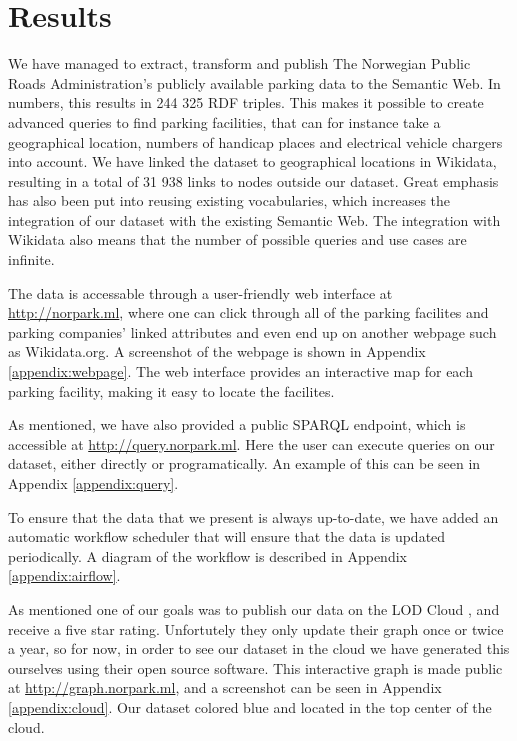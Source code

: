 \chapter{Results}
We have managed to extract, transform and publish The Norwegian Public Roads Administration's publicly available parking data to the Semantic Web. In numbers, this results in 244 325 RDF triples. This makes it possible to create advanced queries to find parking facilities, that can for instance take a geographical location, numbers of handicap places and electrical vehicle chargers into account. We have linked the dataset to geographical locations in Wikidata, resulting in a total of 31 938 links to nodes outside our dataset. Great emphasis has also been put into reusing existing vocabularies, which increases the integration of our dataset with the existing Semantic Web. The integration with Wikidata also means that the number of possible queries and use cases are infinite.

\vspace{5mm}
The data is accessable through a user-friendly web interface at \url{http://norpark.ml}, where one can click through all of the parking facilites and parking companies' linked attributes and even end up on another webpage such as Wikidata.org. A screenshot of the webpage is shown in Appendix \ref{appendix:webpage}. The web interface provides an interactive map for each parking facility, making it easy to locate the facilites.

\vspace{5mm}

As mentioned, we have also provided a public SPARQL endpoint, which is accessible at \url{http://query.norpark.ml}. Here the user can execute queries on our dataset, either directly or programatically. An example of this can be seen in Appendix \ref{appendix:query}.

\vspace{5mm}

To ensure that the data that we present is always up-to-date, we have added an automatic workflow scheduler that will ensure that the data is updated periodically. A diagram of the workflow is described in Appendix \ref{appendix:airflow}.

\vspace{5mm}

As mentioned one of our goals was to publish our data on the LOD Cloud \cite{lod-cloud}, and receive a five star rating. Unfortutely they only update their graph once or twice a year, so for now, in order to see our dataset in the cloud we have generated this ourselves using their open source software. This interactive graph is made public at \url{http://graph.norpark.ml}, and a screenshot can be seen in Appendix \ref{appendix:cloud}. Our dataset colored blue and located in the top center of the cloud.


